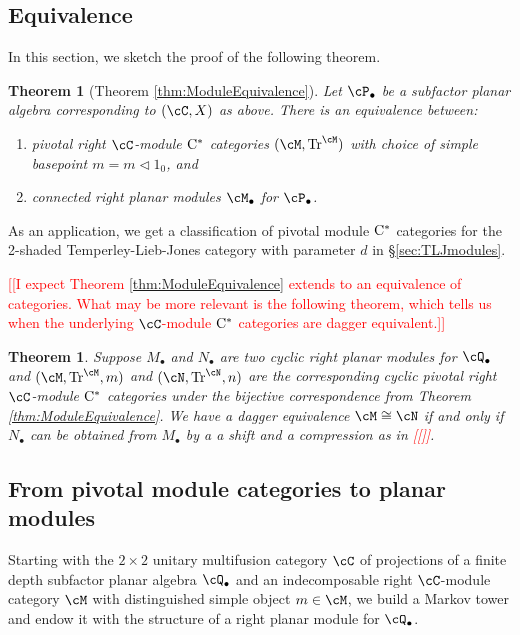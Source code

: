 \documentclass[11pt]{article}
\theoremstyle{plain}
\newtheorem{thm}{Theorem}[section]
\newtheorem*{thm*}{Theorem}
\theoremstyle{definition}
\DeclareMathOperator{\Tr}{Tr}
\newcommand{\Cstar}{\rm{C^*}}
\newcommand{\nn}[1]{\textcolor{red}{[[#1]]}}
\begin{document}
\subsection{Equivalence}


In this section, we sketch the proof of the following theorem.

\begin{thm*}[Theorem \ref{thm:ModuleEquivalence}]
Let $\cP_\bullet$ be a subfactor planar algebra corresponding to $(\cC, X)$ as above.
There is an equivalence between:
\begin{enumerate}[label={\rm(\arabic*)}]
\item
pivotal right $\cC$-module $\Cstar$ categories $(\cM,\Tr^\cM)$ with choice of simple basepoint $m = m\vartriangleleft 1_0$, and
\item
connected right planar modules $\cM_\bullet$ for $\cP_\bullet$.
\end{enumerate}
\end{thm*}

As an application, we get a classification of pivotal module $\Cstar$ categories for the 2-shaded Temperley-Lieb-Jones category with parameter $d$ in \S\ref{sec:TLJmodules}.

\nn{I expect Theorem \ref{thm:ModuleEquivalence} extends to an equivalence of categories.
What may be more relevant is the following theorem, which tells us when the underlying $\cC$-module $\Cstar$ categories are dagger equivalent.}

\begin{thm}
Suppose $M_\bullet$ and $N_\bullet$ are two cyclic right planar modules for $\cQ_\bullet$ and $(\cM, \Tr^\cM,m)$ and $(\cN, \Tr^\cN,n)$ are the corresponding cyclic pivotal right $\cC$-module $\Cstar$ categories under the bijective correspondence from Theorem \ref{thm:ModuleEquivalence}.
We have a dagger equivalence $\cM \cong \cN$ if and only if $N_\bullet$ can be obtained from $M_\bullet$ by a a shift and a compression as in \nn{}.
\end{thm}

\subsection{From pivotal module categories to planar modules}

Starting with the $2\times 2$ unitary multifusion category $\cC$ of projections of a finite depth subfactor planar algebra $\cQ_\bullet$ and an indecomposable right $\cC$-module category $\cM$ with distinguished simple object $m\in \cM$, we build a Markov tower and endow it with the structure of a right planar module for $\cQ_\bullet$.
\end{document}
